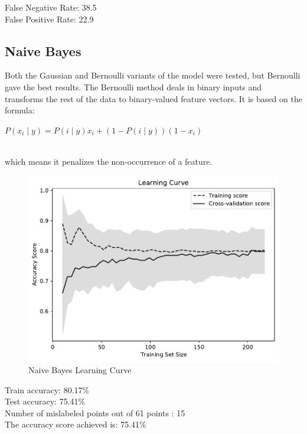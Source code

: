 \documentclass[conference]{IEEEtran}
\begin{document}
\noindent
False Negative Rate: 38.5
\\False Positive Rate: 22.9
\newpage


\subsection{Naive Bayes}
Both the Gaussian and Bernoulli variants of the model were tested, but Bernoulli gave the best results. The Bernoulli method deals in binary inputs and transforms the rest of the data to binary-valued feature vectors. It is based on the formula:
\\[\baselineskip]
\centerline{$P(x_i \mid y) = P(i \mid y) x_i + (1 - P(i \mid y)) (1 - x_i)$}
\\[\baselineskip]
which means it penalizes the non-occurrence of a feature.

\begin{figure}[H]
    \centerline{\includegraphics[width=0.9\linewidth]{images/BernoulliNB_lc.pdf}}
    \caption{Naive Bayes Learning Curve}
    \label{nb_lc}
\end{figure}

\noindent
Train accuracy: 80.17\%
\\Test accuracy: 75.41\%
\\[\baselineskip]
Number of mislabeled points out of 61 points : 15
\\The accuracy score achieved is: 75.41\%
\end{document}
